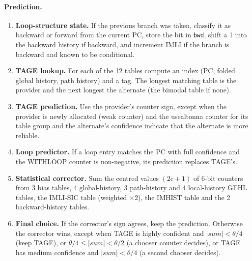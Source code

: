 \documentclass[11pt,a4paper]{article}
\newcommand{\code}[1]{\texttt{#1}}
\renewcommand{\_}{\textunderscore\allowbreak}
\begin{document}
\paragraph{Prediction.}
\begin{enumerate}
\item \textbf{Loop-structure state.} If the previous branch was taken, classify it as backward or forward from the current PC, store the bit in \code{bwd}, shift a 1 into the backward history if backward, and increment IMLI if the branch is backward and known to be conditional.
\item \textbf{TAGE lookup.} For each of the 12 tables compute an index (PC, folded global history, path history) and a tag. The longest matching table is the provider and the next longest the alternate (the bimodal table if none).
\item \textbf{TAGE prediction.} Use the provider's counter sign, except when the provider is newly allocated (weak counter) and the use\_alt\_on\_na counter for its table group and the alternate's confidence indicate that the alternate is more reliable.
\item \textbf{Loop predictor.} If a loop entry matches the PC with full confidence and the WITHLOOP counter is non-negative, its prediction replaces TAGE's.
\item \textbf{Statistical corrector.} Sum the centred values $(2c+1)$ of 6-bit counters from 3 bias tables, 4 global-history, 3 path-history and 4 local-history GEHL tables, the IMLI-SIC table (weighted $\times 2$), the IMHIST table and the 2 backward-history tables.
\item \textbf{Final choice.} If the corrector's sign agrees, keep the prediction. Otherwise the corrector wins, except when TAGE is highly confident and $|\mathit{sum}| < \theta/4$ (keep TAGE), or $\theta/4 \le |\mathit{sum}| < \theta/2$ (a chooser counter decides), or TAGE has medium confidence and $|\mathit{sum}| < \theta/4$ (a second chooser decides).
\end{enumerate}
\end{document}
